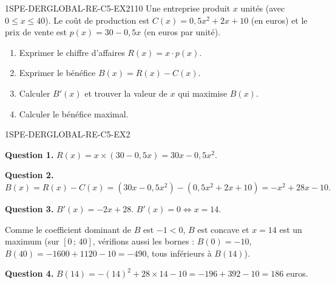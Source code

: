 
\begin{exercice}{1SPE-DERGLOBAL-RE-C5-EX2}{1}{10}
Une entreprise produit $x$ unités (avec $0 \leqslant x \leqslant 40$). Le coût de production est $C(x) = 0{,}5x^2 + 2x + 10$ (en euros) et le prix de vente est $p(x) = 30 - 0{,}5x$ (en euros par unité).
\begin{enumerate}
  \item Exprimer le chiffre d'affaires $R(x) = x \cdot p(x)$.
  \item Exprimer le bénéfice $B(x) = R(x) - C(x)$.
  \item Calculer $B'(x)$ et trouver la valeur de $x$ qui maximise $B(x)$.
  \item Calculer le bénéfice maximal.
\end{enumerate}
\end{exercice}


\begin{corrige}{1SPE-DERGLOBAL-RE-C5-EX2}

\textbf{Question 1.}
$R(x) = x \times (30 - 0{,}5x) = 30x - 0{,}5x^2.$

\textbf{Question 2.}
$B(x) = R(x) - C(x) = (30x - 0{,}5x^2) - (0{,}5x^2 + 2x + 10) = -x^2 + 28x - 10.$

\textbf{Question 3.}
$B'(x) = -2x + 28.$ $B'(x) = 0 \Leftrightarrow x = 14.$

Comme le coefficient dominant de $B$ est $-1 < 0$, $B$ est concave et $x = 14$ est un maximum (sur $[0\,;\,40]$, vérifions aussi les bornes : $B(0) = -10$, $B(40) = -1600 + 1120 - 10 = -490$, tous inférieurs à $B(14)$).


\textbf{Question 4.}
$B(14) = -(14)^2 + 28 \times 14 - 10 = -196 + 392 - 10 = 186$ euros.

\end{corrige}


